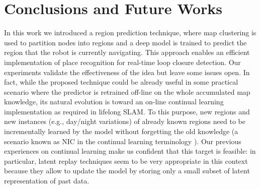 \documentclass[letterpaper, 10 pt, conference]{ieeeconf}  %
\begin{document}
\section{Conclusions and Future Works} \label{conclusions}
In this work we introduced a region prediction technique, where map clustering is used to partition nodes into regions and a deep model is trained to predict the region that the robot is currently navigating. This approach enables an efficient implementation of place recognition for real-time loop closure detection. Our experiments validate the effectiveness of the idea but leave some issues open. In fact, while the proposed technique could be already useful in some practical scenario where the predictor is retrained off-line on the whole accumulated map knowledge, its natural evolution is toward an on-line continual learning implementation as required in lifelong SLAM. To this purpose, new regions and new instances (e.g., day/night variations) of already known regions need to be incrementally learned by the model without forgetting the old knowledge (a scenario known as NIC in the continual learning terminology \cite{b19}). Our previous experiences on continual learning make us confident that this target is feasible: in particular, latent replay techniques \cite{b20} seem to be very appropriate in this context because they allow to update the model by storing only a small subset of latent representation of past data.  
\end{document}
